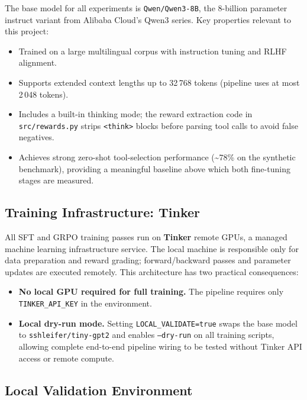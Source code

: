 \documentclass[12pt, a4paper]{article}
\begin{document}
The base model for all experiments is \texttt{Qwen/Qwen3-8B}, the 8-billion
parameter instruct variant from Alibaba Cloud's Qwen3 series. Key properties
relevant to this project:

\begin{itemize}[leftmargin=1.5em, itemsep=4pt]
  \item Trained on a large multilingual corpus with instruction tuning and
    RLHF alignment.
  \item Supports extended context lengths up to 32\,768 tokens (pipeline uses
    at most 2\,048 tokens).
  \item Includes a built-in thinking mode; the reward extraction code in
    \texttt{src/rewards.py} strips \texttt{<think>} blocks before parsing tool
    calls to avoid false negatives.
  \item Achieves strong zero-shot tool-selection performance
    (\textasciitilde78\% on the synthetic benchmark), providing a meaningful
    baseline above which both fine-tuning stages are measured.
\end{itemize}

\subsection{Training Infrastructure: Tinker}

All SFT and GRPO training passes run on \textbf{Tinker} remote GPUs, a managed
machine learning infrastructure service. The local machine is responsible only
for data preparation and reward grading; forward/backward passes and parameter
updates are executed remotely. This architecture has two practical
consequences:

\begin{itemize}[leftmargin=1.5em, itemsep=4pt]
  \item \textbf{No local GPU required for full training.} The pipeline requires
    only \texttt{TINKER\_API\_KEY} in the environment.
  \item \textbf{Local dry-run mode.} Setting \texttt{LOCAL\_VALIDATE=true}
    swaps the base model to \texttt{sshleifer/tiny-gpt2} and enables
    \texttt{--dry-run} on all training scripts, allowing complete end-to-end
    pipeline wiring to be tested without Tinker API access or remote compute.
\end{itemize}

\subsection{Local Validation Environment}
\end{document}
